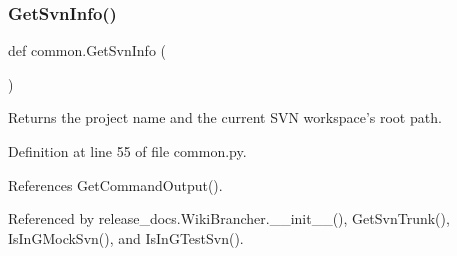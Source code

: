 \subsubsection{\texorpdfstring{Get\+Svn\+Info()}{GetSvnInfo()}}
{\footnotesize\ttfamily def common.\+Get\+Svn\+Info (\begin{DoxyParamCaption}{ }\end{DoxyParamCaption})}

\begin{DoxyVerb}Returns the project name and the current SVN workspace's root path.\end{DoxyVerb}
 

Definition at line 55 of file common.\+py.



References Get\+Command\+Output().



Referenced by release\+\_\+docs.\+Wiki\+Brancher.\+\_\+\+\_\+init\+\_\+\+\_\+(), Get\+Svn\+Trunk(), Is\+In\+G\+Mock\+Svn(), and Is\+In\+G\+Test\+Svn().



